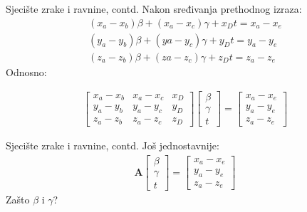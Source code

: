 \documentclass[9pt]{beamer}
\begin{document}
\begin{frame}{Sjecište zrake i ravnine, contd.}
Nakon sređivanja prethodnog izraza:
\begin{align*}
(x_a-x_b)\beta + (x_a-x_c)\gamma + x_Dt=x_a-x_e\\
(y_a-y_b)\beta + (ya-y_c)\gamma + y_Dt=y_a-y_e\\
(z_a-z_b)\beta + (za-z_c)\gamma + z_Dt=z_a-z_e
\end{align*}
Odnosno:

\begin{align*}
\left[
\begin{array}{ccc}
x_a-x_b&  x_a-x_c&  x_D \\ 
y_a-y_b&  y_a-y_c&  y_D  \\ 
z_a-z_b&  z_a-z_c&  z_D
\end{array} 
\right]
\left[
\begin{array}{c}
\beta \\ \gamma \\ t
\end{array} 
\right] =
\left[
\begin{array}{c}
x_a-x_e \\ y_a-y_e \\ z_a-z_e
\end{array} 
\right]
\end{align*}
\end{frame}	

\begin{frame}{Sjecište zrake i ravnine, contd.}
Još jednostavnije:
\begin{align*}
\textbf{A}
\left[
\begin{array}{c}
\beta \\ \gamma \\ t
\end{array} 
\right] =
\left[
\begin{array}{c}
x_a-x_e \\ y_a-y_e \\ z_a-z_e
\end{array} 
\right]
\end{align*}
Zašto $\beta$ i $\gamma$?
\end{frame}
\end{document}
